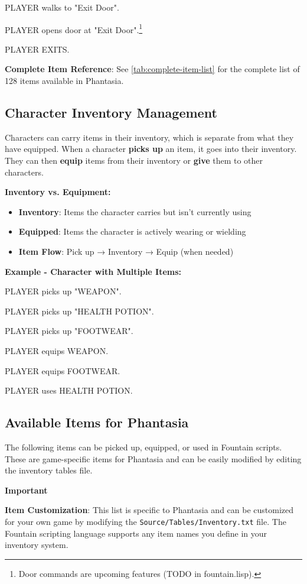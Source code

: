 \documentclass[11pt,letterpaper,oldstylefigures]{memoir}
\newcommand{\stagedir}[1]{#1\par\vspace{1\baselineskip}}
\newenvironment{FountainExample}
  {\begingroup
  \ttfamily\small
   \setlength{\parindent}{0pt}
  \setlength{\parskip}{0.5em}
  \allowdisplaybreaks
  \setlength{\displaywidowpenalty}{0}
  \setlength{\widowpenalty}{0}
  \setlength{\clubpenalty}{0}
  \setlength{\interlinepenalty}{0}
}
  {\endgroup}
\newenvironment{Important}
{\begingroup
\small
\setlength{\parindent}{0pt}
\setlength{\parskip}{0.5em}
\allowdisplaybreaks
\setlength{\displaywidowpenalty}{0}
\setlength{\widowpenalty}{0}
\setlength{\clubpenalty}{0}
\setlength{\interlinepenalty}{0}
\begin{tcolorbox}[
    colback=yellow!5,
    colframe=yellow!75!black,
    boxrule=0.5pt,
    arc=2pt,
    left=0.5em,
    right=0.5em,
    top=0.25em,
    bottom=0.25em
]
\textbf{Important}
\end{tcolorbox}\par
}
{\endgroup}
\newcommand{\fountain}[1]{\textbf{#1}}
\newcommand{\Phantasia}{{\irishfont Phantasia}}
\begin{document}
\begin{FountainExample}
\stagedir{PLAYER walks to "Exit Door".}
\stagedir{PLAYER opens door at "Exit Door".\footnote{Door commands are upcoming features (TODO in fountain.lisp).}}
\stagedir{PLAYER EXITS.}
\end{FountainExample}

\textbf{Complete Item Reference}: See \autoref{tab:complete-item-list} for the complete list of 128 items available in \Phantasia{}.

\subsection{Character Inventory Management}

Characters can carry items in their inventory, which is separate from what they have equipped. When a character \fountain{picks up} an item, it goes into their inventory. They can then \fountain{equip} items from their inventory or \fountain{give} them to other characters.

\textbf{Inventory vs. Equipment:}
\begin{itemize}
\item \textbf{Inventory}: Items the character carries but isn't currently using
\item \textbf{Equipped}: Items the character is actively wearing or wielding
\item \textbf{Item Flow}: Pick up → Inventory → Equip (when needed)
\end{itemize}

\textbf{Example - Character with Multiple Items:}
\begin{FountainExample}
\stagedir{PLAYER picks up "WEAPON".}
\stagedir{PLAYER picks up "HEALTH POTION".}
\stagedir{PLAYER picks up "FOOTWEAR".}
\stagedir{PLAYER equips WEAPON.}
\stagedir{PLAYER equips FOOTWEAR.}
\stagedir{PLAYER uses HEALTH POTION.}
\end{FountainExample}

\subsection{Available Items for \Phantasia}

The following items can be picked up, equipped, or used in Fountain scripts. These are game-specific items for \Phantasia{} and can be easily modified by editing the inventory tables file.

\begin{Important}
\textbf{Item Customization}: This list is specific to \Phantasia{} and can be customized for your own game by modifying the \texttt{Source/Tables/Inventory.txt} file. The Fountain scripting language supports any item names you define in your inventory system.
\end{Important}
\end{document}
